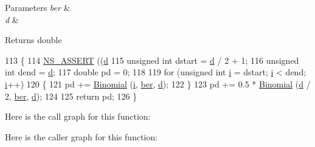\begin{DoxyParams}{Parameters}
{\em ber} & \\
\hline
{\em d} & \\
\hline
\end{DoxyParams}
\begin{DoxyReturn}{Returns}
double 
\end{DoxyReturn}

\begin{DoxyCode}
113 \{
114   \hyperlink{assert_8h_a6dccdb0de9b252f60088ce281c49d052}{NS\_ASSERT} ((\hyperlink{buildings__pathloss_8m_a9f9b934daed17a4d3613b6886ff4cf4b}{d} %
115   \textcolor{keywordtype}{unsigned} \textcolor{keywordtype}{int} dstart = \hyperlink{buildings__pathloss_8m_a9f9b934daed17a4d3613b6886ff4cf4b}{d} / 2 + 1;
116   \textcolor{keywordtype}{unsigned} \textcolor{keywordtype}{int} dend = \hyperlink{buildings__pathloss_8m_a9f9b934daed17a4d3613b6886ff4cf4b}{d};
117   \textcolor{keywordtype}{double} pd = 0;
118 
119   \textcolor{keywordflow}{for} (\textcolor{keywordtype}{unsigned} \textcolor{keywordtype}{int} \hyperlink{bernuolliDistribution_8m_a6f6ccfcf58b31cb6412107d9d5281426}{i} = dstart; \hyperlink{bernuolliDistribution_8m_a6f6ccfcf58b31cb6412107d9d5281426}{i} < dend; \hyperlink{bernuolliDistribution_8m_a6f6ccfcf58b31cb6412107d9d5281426}{i}++)
120     \{
121       pd +=  \hyperlink{classns3_1_1YansErrorRateModel_a7d43b7444a4af7ad0d56f285ebe06bf5}{Binomial} (\hyperlink{bernuolliDistribution_8m_a6f6ccfcf58b31cb6412107d9d5281426}{i}, \hyperlink{lte__cqi__generation_8m_a197619a3539acfc577325d6e41b6ce95}{ber}, \hyperlink{buildings__pathloss_8m_a9f9b934daed17a4d3613b6886ff4cf4b}{d});
122     \}
123   pd += 0.5 * \hyperlink{classns3_1_1YansErrorRateModel_a7d43b7444a4af7ad0d56f285ebe06bf5}{Binomial} (\hyperlink{buildings__pathloss_8m_a9f9b934daed17a4d3613b6886ff4cf4b}{d} / 2, \hyperlink{lte__cqi__generation_8m_a197619a3539acfc577325d6e41b6ce95}{ber}, \hyperlink{buildings__pathloss_8m_a9f9b934daed17a4d3613b6886ff4cf4b}{d});
124 
125   \textcolor{keywordflow}{return} pd;
126 \}
\end{DoxyCode}


Here is the call graph for this function\+:




Here is the caller graph for this function\+:


